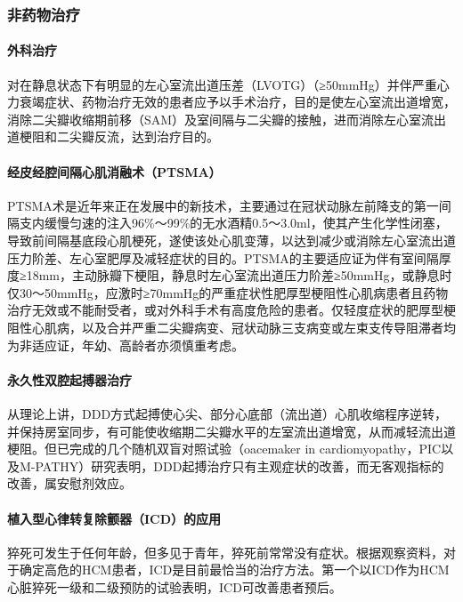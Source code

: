 \subsubsection{非药物治疗}

\paragraph{外科治疗}

对在静息状态下有明显的左心室流出道压差（LVOTG）（≥50mmHg）并伴严重心力衰竭症状、药物治疗无效的患者应予以手术治疗，目的是使左心室流出道增宽，消除二尖瓣收缩期前移（SAM）及室间隔与二尖瓣的接触，进而消除左心室流出道梗阻和二尖瓣反流，达到治疗目的。

\paragraph{经皮经腔间隔心肌消融术（PTSMA）}

PTSMA术是近年来正在发展中的新技术，主要通过在冠状动脉左前降支的第一间隔支内缓慢匀速的注入96\%～99\%的无水酒精0.5～3.0ml，使其产生化学性闭塞，导致前间隔基底段心肌梗死，遂使该处心肌变薄，以达到减少或消除左心室流出道压力阶差、左心室肥厚及减轻症状的目的。PTSMA的主要适应证为伴有室间隔厚度≥18mm，主动脉瓣下梗阻，静息时左心室流出道压力阶差≥50mmHg，或静息时仅30～50mmHg，应激时≥70mmHg的严重症状性肥厚型梗阻性心肌病患者且药物治疗无效或不能耐受者，或对外科手术有高度危险的患者。仅轻度症状的肥厚型梗阻性心肌病，以及合并严重二尖瓣病变、冠状动脉三支病变或左束支传导阻滞者均为非适应证，年幼、高龄者亦须慎重考虑。

\paragraph{永久性双腔起搏器治疗}

从理论上讲，DDD方式起搏使心尖、部分心底部（流出道）心肌收缩程序逆转，并保持房室同步，有可能使收缩期二尖瓣水平的左室流出道增宽，从而减轻流出道梗阻。但已完成的几个随机双盲对照试验（oacemaker
in
cardiomyopathy，PIC以及M-PATHY）研究表明，DDD起搏治疗只有主观症状的改善，而无客观指标的改善，属安慰剂效应。

\paragraph{植入型心律转复除颤器（ICD）的应用}

猝死可发生于任何年龄，但多见于青年，猝死前常常没有症状。根据观察资料，对于确定高危的HCM患者，ICD是目前最恰当的治疗方法。第一个以ICD作为HCM心脏猝死一级和二级预防的试验表明，ICD可改善患者预后。

